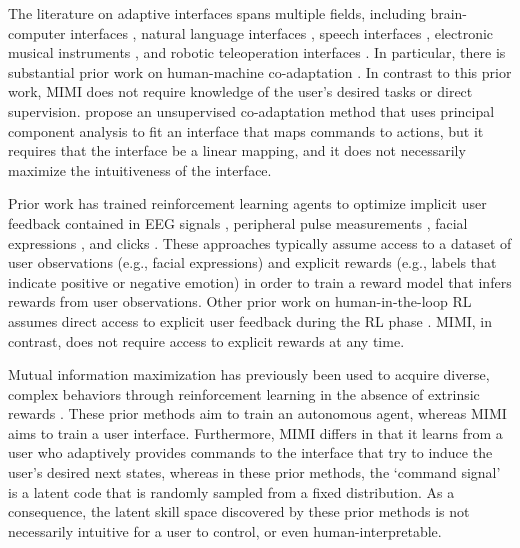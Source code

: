 \documentclass{article}
\begin{document}
The literature on adaptive interfaces spans multiple fields, including brain-computer interfaces \cite{gilja2012high,dangi2013design,merel2013multi,dangi2014continuous,merel2015neuroprosthetic,anumanchipalli2019speech,willett2020high}, natural language interfaces \cite{wang2016learning,karamcheti2020learning}, speech interfaces \cite{fels1993glove,fels1997glove}, electronic musical instruments \cite{hunt2002mapping}, and robotic teleoperation interfaces \cite{pilarski2011online,broad2017learning,reddy2018shared,schaff2020residual,du2020ave,jeon2020shared}.
In particular, there is substantial prior work on human-machine co-adaptation \cite{sanchez2009exploiting,gallina2015progressive,nikolaidis2017human,couraud2018model,ehrlich2018human,ehrlich2019computational,kim2020errors}.
In contrast to this prior work, MIMI does not require knowledge of the user's desired tasks or direct supervision.
\cite{de2018unsupervised,de2021framework} propose an unsupervised co-adaptation method that uses principal component analysis to fit an interface that maps commands to actions, but it requires that the interface be a linear mapping, and it does not necessarily maximize the intuitiveness of the interface.

Prior work has trained reinforcement learning agents to optimize implicit user feedback contained in EEG signals \cite{xu2020accelerating}, peripheral pulse measurements \cite{mcduff2018visceral}, facial expressions \cite{jaques2018learning,cui2020empathic}, and clicks \cite{radlinski2006evaluating}.
These approaches typically assume access to a dataset of user observations (e.g., facial expressions) and explicit rewards (e.g., labels that indicate positive or negative emotion) in order to train a reward model that infers rewards from user observations.
Other prior work on human-in-the-loop RL assumes direct access to explicit user feedback during the RL phase \cite{knox2009interactively,pilarski2011online,macglashan2017interactive,dorsa2017active,reddy2018shared}.
MIMI, in contrast, does not require access to explicit rewards at any time.

Mutual information maximization has previously been used to acquire diverse, complex behaviors through reinforcement learning in the absence of extrinsic rewards \cite{daniel2012hierarchical,gregor2016variational,eysenbach2018diversity,warde2018unsupervised,sharma2019dynamics,hansen2019fast,laskin2022cic}.
These prior methods aim to train an autonomous agent, whereas MIMI aims to train a user interface.
Furthermore, MIMI differs in that it learns from a user who adaptively provides commands to the interface that try to induce the user's desired next states, whereas in these prior methods, the `command signal' is a latent code that is randomly sampled from a fixed distribution.
As a consequence, the latent skill space discovered by these prior methods is not necessarily intuitive for a user to control, or even human-interpretable.
\end{document}
